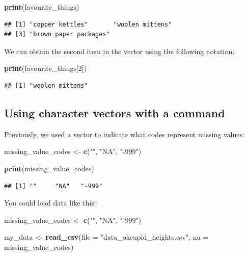 \documentclass[
]{krantz}
\makeatletter
\newenvironment{Shaded}{\begin{snugshade}}{\end{snugshade}}
\newcommand{\DataTypeTok}[1]{\textcolor[rgb]{0.27,0.27,0.27}{#1}}
\newcommand{\DecValTok}[1]{\textcolor[rgb]{0.06,0.06,0.06}{#1}}
\newcommand{\KeywordTok}[1]{\textcolor[rgb]{0.27,0.27,0.27}{\textbf{#1}}}
\newcommand{\NormalTok}[1]{#1}
\newcommand{\StringTok}[1]{\textcolor[rgb]{0.5,0.5,0.5}{#1}}
\newenvironment{kframe}{%
\medskip{}
\setlength{\fboxsep}{.8em}
 \def\at@end@of@kframe{}%
 \ifinner\ifhmode%
  \def\at@end@of@kframe{\end{minipage}}%
  \begin{minipage}{\columnwidth}%
 \fi\fi%
 \def\FrameCommand##1{\hskip\@totalleftmargin \hskip-\fboxsep
 \colorbox{shadecolor}{##1}\hskip-\fboxsep
     \hskip-\linewidth \hskip-\@totalleftmargin \hskip\columnwidth}%
 \MakeFramed {\advance\hsize-\width
   \@totalleftmargin\z@ \linewidth\hsize
   \@setminipage}}%
 {\par\unskip\endMakeFramed%
 \at@end@of@kframe}
\renewenvironment{Shaded}{\begin{kframe}}{\end{kframe}}
\makeatother
\begin{document}
\begin{Shaded}
\begin{Highlighting}[]
\KeywordTok{print}\NormalTok{(favourite_things)}
\end{Highlighting}
\end{Shaded}

\begin{verbatim}
## [1] "copper kettles"       "woolen mittens"      
## [3] "brown paper packages"
\end{verbatim}

We can obtain the second item in the vector using the following notation:

\begin{Shaded}
\begin{Highlighting}[]
\KeywordTok{print}\NormalTok{(favourite_things[}\DecValTok{2}\NormalTok{])}
\end{Highlighting}
\end{Shaded}

\begin{verbatim}
## [1] "woolen mittens"
\end{verbatim}

\hypertarget{using-character-vectors-with-a-command}{%
\subsection{Using character vectors with a command}\label{using-character-vectors-with-a-command}}

Previously, we used a vector to indicate what codes represent missing values:

\begin{Shaded}
\begin{Highlighting}[]
\NormalTok{missing_value_codes <-}\StringTok{ }\KeywordTok{c}\NormalTok{(}\StringTok{""}\NormalTok{, }\StringTok{"NA"}\NormalTok{, }\StringTok{"-999"}\NormalTok{)}

\KeywordTok{print}\NormalTok{(missing_value_codes)}
\end{Highlighting}
\end{Shaded}

\begin{verbatim}
## [1] ""     "NA"   "-999"
\end{verbatim}

You could load data like this:

\begin{Shaded}
\begin{Highlighting}[]
\NormalTok{missing_value_codes <-}\StringTok{ }\KeywordTok{c}\NormalTok{(}\StringTok{""}\NormalTok{, }\StringTok{"NA"}\NormalTok{, }\StringTok{"-999"}\NormalTok{)}

\NormalTok{my_data <-}\StringTok{ }\KeywordTok{read_csv}\NormalTok{(}\DataTypeTok{file =} \StringTok{"data_okcupid_heights.csv"}\NormalTok{, }
                    \DataTypeTok{na =}\NormalTok{ missing_value_codes)}
\end{Highlighting}
\end{Shaded}
\end{document}
